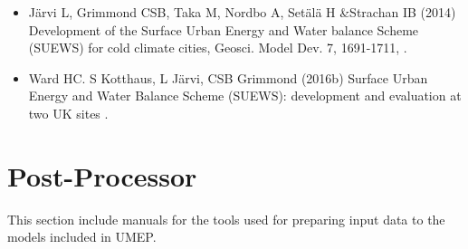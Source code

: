 \documentclass[letterpaper,10pt,english]{sphinxmanual}
\begin{document}
\begin{itemize}
\begin{description}
\begin{itemize}
\item {} 
Järvi L, Grimmond CSB, Taka M, Nordbo A, Setälä H \&Strachan IB (2014) Development of the Surface Urban Energy and Water balance Scheme (SUEWS) for cold climate cities, Geosci. Model Dev. 7, 1691-1711, .

\item {} 
Ward HC. S Kotthaus, L Järvi, CSB Grimmond (2016b) Surface Urban Energy and Water Balance Scheme (SUEWS): development and evaluation at two UK sites .

\end{itemize}

\end{description}

\end{itemize}


\chapter{Post-Processor}
\label{\detokenize{post_processor/Post-Processor:post-processor}}\label{\detokenize{post_processor/Post-Processor::doc}}
This section include manuals for the tools used for preparing input data to the models included in UMEP.
\end{document}
